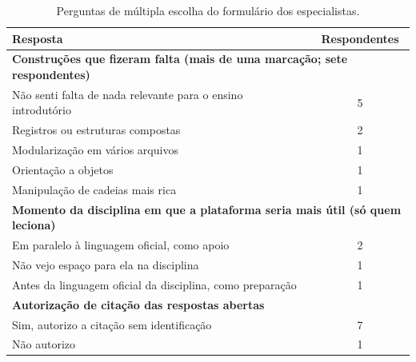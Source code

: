 \begin{table}[htbp]
\centering
\caption{Perguntas de múltipla escolha do formulário dos especialistas.}
\label{tab:ap-multipla}
\footnotesize
\renewcommand{\arraystretch}{1.2}
\begin{tabular}{|p{10.5cm}|c|}
\hline
\textbf{Resposta} & \textbf{Respondentes} \\\hline
\multicolumn{2}{|l|}{\textbf{Construções que fizeram falta (mais de uma marcação; sete respondentes)}} \\\hline
Não senti falta de nada relevante para o ensino introdutório & 5 \\\hline
Registros ou estruturas compostas & 2 \\\hline
Modularização em vários arquivos & 1 \\\hline
Orientação a objetos & 1 \\\hline
Manipulação de cadeias mais rica & 1 \\\hline
\multicolumn{2}{|l|}{\textbf{Momento da disciplina em que a plataforma seria mais útil (só quem leciona)}} \\\hline
Em paralelo à linguagem oficial, como apoio & 2 \\\hline
Não vejo espaço para ela na disciplina & 1 \\\hline
Antes da linguagem oficial da disciplina, como preparação & 1 \\\hline
\multicolumn{2}{|l|}{\textbf{Autorização de citação das respostas abertas}} \\\hline
Sim, autorizo a citação sem identificação & 7 \\\hline
Não autorizo & 1 \\\hline
\end{tabular}
\end{table}

